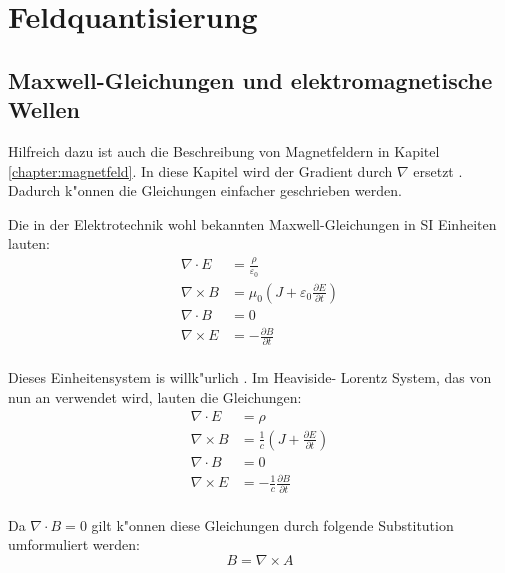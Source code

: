 \chapter{Feldquantisierung\label{chapter:feldquantisierung}}
\begin{refsection}

\printbibliography[heading=subbibliography]
\end{refsection}

\section{Maxwell-Gleichungen und elektromagnetische Wellen}

Hilfreich dazu ist auch die Beschreibung von Magnetfeldern in Kapitel \ref{chapter:magnetfeld}. In diese Kapitel wird der Gradient durch $\nabla$ ersetzt \cite{fq:nabla}. Dadurch k"onnen die Gleichungen einfacher geschrieben werden. 

Die in der Elektrotechnik wohl bekannten Maxwell-Gleichungen in SI Einheiten lauten:
\begin{equation}
\begin{split}
\nabla\cdot E &= \frac{\rho}{\varepsilon_0} \\
\nabla\times B &= \mu_0( J  + \varepsilon_0\frac{\partial E}{\partial t}) \\
\nabla\cdot B &=0 \\
\nabla\times E &= -\frac{\partial B }{\partial t}\\
\end{split}
\end{equation}

Dieses Einheitensystem is willk"urlich \cite{fq:em_units}. Im Heaviside-
Lorentz System, das von nun an verwendet wird, lauten die Gleichungen:
\begin{equation}
\begin{split}
\nabla\cdot E &= \rho \\
\nabla\times B &= \frac{1}{c}( J  + \frac{\partial E}{\partial t}) \\
\nabla\cdot B &=0 \\
\nabla\times E &= -\frac{1}{c} \frac{\partial B }{\partial t}\\
\end{split}
\end{equation}

Da $\nabla \cdot B = 0 $ gilt k"onnen diese Gleichungen durch folgende Substitution umformuliert werden:
\begin{equation}
B = \nabla\times A 
\end{equation}

